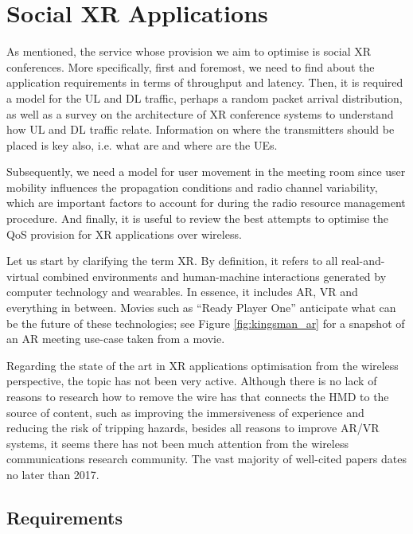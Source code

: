 \section{Social XR Applications}
\label{sec:sxr_applications}

As mentioned, the service whose provision we aim to optimise is social XR conferences. More specifically, first and foremost, we need to find about the application requirements in terms of throughput and latency. Then, it is required a model for the \ac{UL} and \ac{DL} traffic, perhaps a random packet arrival distribution, as well as a survey on the architecture of XR conference systems to understand how \ac{UL} and \ac{DL} traffic relate. Information on where the transmitters should be placed is key also, i.e. what are and where are the \acp{UE}.

Subsequently, we need a model for user movement in the meeting room since user mobility influences the propagation conditions and radio channel variability, which are important factors to account for during the radio resource management procedure. And finally, it is useful to review the best attempts to optimise the \ac{QoS} provision for XR applications over wireless.

Let us start by clarifying the term \ac{XR}. By definition, it refers to all real-and-virtual combined environments and human-machine interactions generated by computer technology and wearables. In essence, it includes \ac{AR}, \ac{VR} and everything in between. Movies such as ``Ready Player One'' \cite{readyPlayerOne} anticipate what can be the future of these technologies; see Figure \ref{fig:kingsman_ar} for a snapshot of an AR meeting use-case taken from a movie.



Regarding the state of the art in XR applications optimisation from the wireless perspective, the topic has not been very active. Although there is no lack of reasons to research how to remove the wire has that connects the \ac{HMD} to the source of content, such as improving the immersiveness of experience and reducing the risk of tripping hazards, besides all reasons to improve \ac{AR}/\ac{VR} systems, it seems there has not been much attention from the wireless communications research community. The vast majority of well-cited papers dates no later than 2017.

\subsection*{Requirements}

